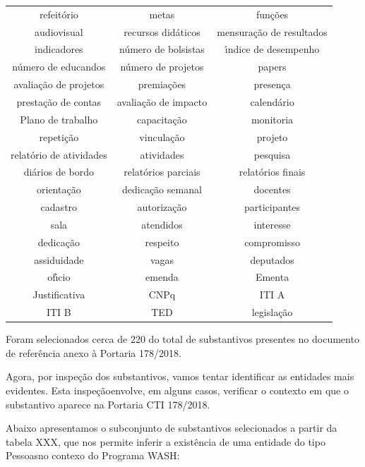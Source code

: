 \documentclass[
12pt,		%
openright,	%
twoside,  %
a4paper,			%
chapter=TITLE,		%
english,			%
french,				%
spanish,			%
brazil				%
]{USPSC-classe/USPSC}
\begin{document}
\begin{table}[htb]
\begin{tabular}{|c|c|c|}
refeit\'orio  &  metas  &  fun\c{c}\~oes \\
audiovisual  &  recursos did\'aticos  &  mensura\c{c}\~ao de resultados \\
indicadores  &  n\'umero de bolsistas  &  \'{\i}ndice de desempenho \\
n\'umero de educandos  &  n\'umero de projetos  &  papers \\
avalia\c{c}\~ao de projetos  &  premia\c{c}\~oes  &  presen\c{c}a  \\
presta\c{c}\~ao de contas  &  avalia\c{c}\~ao de impacto  &  calend\'ario \\
Plano de trabalho  &  capacita\c{c}\~ao  &  monitoria \\
repeti\c{c}\~ao  &  vincula\c{c}\~ao  &  projeto \\
relat\'orio de atividades  &  atividades  &  pesquisa \\
di\'arios de bordo  &  relat\'orios parciais  &  relat\'orios finais \\
orienta\c{c}\~ao  &  dedica\c{c}\~ao semanal  &  docentes \\
cadastro  &  autoriza\c{c}\~ao  &  participantes \\
sala  &  atendidos  &  interesse \\
dedica\c{c}\~ao  &  respeito  &  compromisso \\
assiduidade  &  vagas  &  deputados \\
of\'{\i}cio  &  emenda  &  Ementa \\
Justificativa  &  CNPq  &  ITI A \\
ITI B  &  TED  &  legisla\c{c}\~ao \\
\hline
\end{tabular}
\end{table}


Foram selecionados cerca de 220 do total de substantivos presentes no documento de refer\^encia anexo \`a Portaria 178/2018.




Agora, por inspe\c{c}\~ao dos substantivos, vamos tentar identificar as entidades mais evidentes. Esta \textquotedbl inspe\c{c}\~ao\textquotedbl  envolve, em alguns casos, verificar o contexto em que o substantivo aparece na Portaria CTI 178/2018.




Abaixo apresentamos o subconjunto de substantivos selecionados a partir da tabela XXX, que nos permite inferir a exist\^encia de uma entidade do tipo \textquotedbl Pessoas\textquotedbl  no contexo do Programa WASH:
\end{document}
